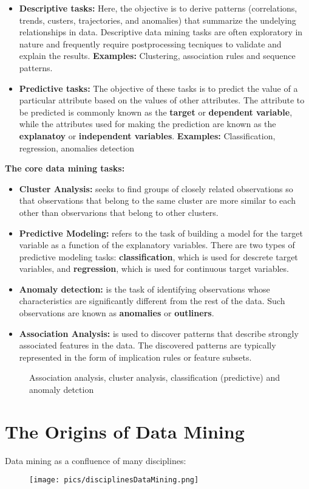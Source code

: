 	\begin{itemize}
		\item {\bf Descriptive tasks:} Here, the objective is to derive patterns 
		(correlations, trends, custers, trajectories, and anomalies) that summarize the undelying relationships in data. Descriptive data mining tasks are often exploratory in nature 
		and frequently require postprocessing tecniques to validate and explain the results. 
		{\bf Examples:} {\color{blue} Clustering, association rules and sequence patterns.}
		\item {\bf Predictive tasks:}  The objective of these tasks is to predict 
		the value of a particular attribute based on the values of other attributes. 
		The attribute to be predicted is commonly known as the {\bf target} or 
		{\bf dependent variable}, while the attributes used for making the prediction are 
		known as the {\bf explanatoy} or {\bf independent variables}. 
		{\bf Examples: }{\color{blue} Classification, regression, anomalies detection} 
	\end{itemize}

	{\bf The core data mining tasks:}
	\begin{itemize}
		\item {\bf Cluster Analysis:} seeks to find groups of closely related observations
		so that observations that belong to the same cluster are more similar to each other
		than observarions that belong to other clusters.
		\item {\bf Predictive Modeling:} refers to the task of building a model for the 
		target variable as a function of the explanatory variables. There are two types of 
		predictive modeling tasks: {\bf classification}, which is used for descrete target 
		variables, and {\bf regression}, which is used for continuous target variables. 
		\item {\bf Anomaly detection:} is the task of identifying observations whose 
		characteristics are significantly different from the rest of the data. Such observations
		are known as {\bf anomalies} or {\bf outliners}.
		\item {\bf Association Analysis:} is used to discover patterns that describe strongly
		associated features in the data. The discovered patterns are typically represented in the 
		form of implication rules or feature subsets. 
	\end{itemize}

	\begin{figure}[H]
		\centering
		\caption{Association analysis, cluster analysis, classification (predictive) 
		and anomaly detction}
	\end{figure}

\section{The Origins of Data Mining}

	Data mining as a confluence of many disciplines:

	\begin{figure}[H]
		\texttt{[image: pics/disciplinesDataMining.png]}
	\end{figure}



	

